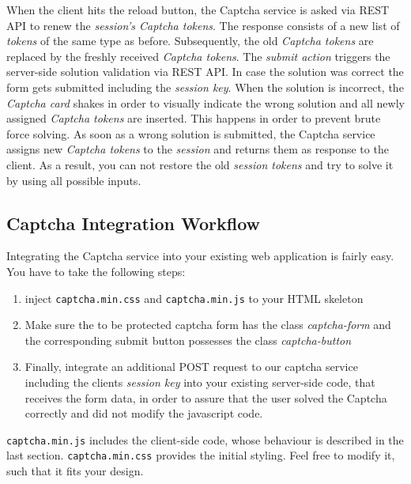  When the client hits the reload button, the Captcha service is asked via REST API to renew the \textit{session's Captcha tokens}. The response consists of a new list of \textit{tokens} of the same type as before. Subsequently, the old \textit{Captcha tokens} are replaced by the freshly received \textit{Captcha tokens}. The \textit{submit action} triggers the server-side solution validation via REST API. In case the solution was correct the form gets submitted including the \textit{session key}. When the solution is incorrect, the \textit{Captcha card} shakes in order to visually indicate the wrong solution and all newly assigned \textit{Captcha tokens} are inserted. This happens in order to prevent brute force solving. As soon as a wrong solution is submitted, the Captcha service assigns new \textit{Captcha tokens} to the \textit{session} and returns them as response to the client. As a result, you can not restore the old \textit{session tokens} and try to solve it by using all possible inputs.

\subsection{Captcha Integration Workflow}
\label{subsec:Captcha Integration Workflow}

Integrating the Captcha service into your existing web application is fairly easy. You have to take the following steps:
\begin{enumerate}
	\item inject \texttt{captcha.min.css} and \texttt{captcha.min.js} to your HTML skeleton
	\item  Make sure the to be protected captcha form has the class \textit{captcha-form} and the corresponding submit button possesses the class \textit{captcha-button}
	\item Finally, integrate an additional POST request to our captcha service including the clients \textit{session key} into your existing server-side code, that receives the form data, in order to assure that the user solved the Captcha correctly and did not modify the javascript code.
\end{enumerate}

\texttt{captcha.min.js} includes the client-side code, whose behaviour is described in the last section. \texttt{captcha.min.css} provides the initial styling. Feel free to modify it, such that it fits your design. 

\clearpage

